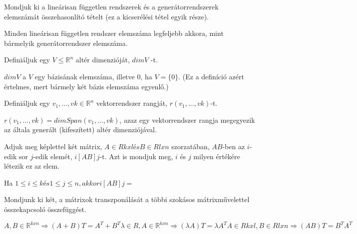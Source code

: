\begin{frame}
  \begin{tcolorbox}[title={9}]
     Mondjuk ki a lineárisan független rendszerek és a generátorrendszerek elemszámát összehasonlító tételt (ez a kicserélési tétel egyik része).



  \tcblower
Minden lineárisan független rendszer elemszáma legfeljebb akkora, mint bármelyik generátorrendszer elemszáma.

  \end{tcolorbox}
\end{frame}


\begin{frame}
  \begin{tcolorbox}[title={10}]
     Definiáljuk egy $V \leq \mathbb{R}^n$ altér dimenzióját, $dimV$ -t.

  \tcblower
$dimV$ a $V$ egy bázisának elemszáma, illetve 0, ha $V = \{0\}$. (Ez a definíció azért értelmes, mert bármely két bázis elemszáma egyenlő.)

  \end{tcolorbox}
\end{frame}



\begin{frame}
  \begin{tcolorbox}[title={11}]
   Definiáljuk egy $v_1,...,vk \in \mathbb{R}^n$ vektorrendszer rangját, $r(v_1,...,vk)$-t.


  \tcblower
$r(v_1,...,vk) = dimSpan(v_1,...,vk)$, azaz egy vektorrendszer rangja megegyezik az általa generált (kifeszített) altér dimenziójával.

  \end{tcolorbox}
\end{frame}


\begin{frame}
  \begin{tcolorbox}[title={12}]
    Adjuk meg képlettel két mátrix, $A \in Rkxl és B \in Rlxn$ szorzatában, $AB$-ben az $i$-edik sor $j$-edik elemét, $i[AB]j$-t. Azt is mondjuk meg, $i$ és $j$ milyen értékére létezik ez az elem.



  \tcblower
Ha $1 \leq i \leq k és 1 \leq j \leq n, akkor i[AB]j =$
  \end{tcolorbox}
\end{frame}



\begin{frame}
  \begin{tcolorbox}[title={13}]
    Mondjunk ki két, a mátrixok transzponálását a többi szokásos mátrixművelettel összekapcsoló összefüggést.

  \tcblower
$A,B \in \mathbb{R}^{k x n} {\Rightarrow} (A + B)T = A^T + B^T {\lambda} \in R,A \in \mathbb{R}^{k x n} {\Rightarrow} ({\lambda}A)T = {\lambda}A^T A \in Rkxl, B \in Rlxn {\Rightarrow} (AB)T = B^TA^T$

  \end{tcolorbox}
\end{frame}




